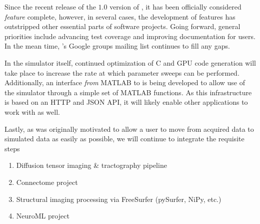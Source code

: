 
Since the recent release of the $1.0$ version of \TVB, it has been 
officially considered \textit{feature} complete, however, in several
cases, the development of features has outstripped other essential 
parts of software projects. Going forward, general priorities include
advancing test coverage and improving documentation for users. In the mean
time, \TVB's Google groups mailing list continues to fill any gaps. 

In the simulator itself, continued optimization of C and GPU code generation
will take place to increase the rate at which parameter sweeps can be
performed. Additionally, an interface \textit{from} MATLAB to \TVB 
is being developed to allow use of the simulator through a simple
set of MATLAB functions. As this infrastructure is based on an HTTP and 
JSON API, it will likely enable other applications to work with \TVB as well.

Lastly, as \TVB was originally motivated to allow a user to move from
acquired data to simulated data as easily as possible, we will continue
to integrate the requisite steps 

\begin{enumerate}
	\item Diffusion tensor imaging \& tractography pipeline
	\item Connectome project
	\item Structural imaging processing via FreeSurfer (pySurfer, NiPy, etc.)
	\item NeuroML project	
\end{enumerate}


